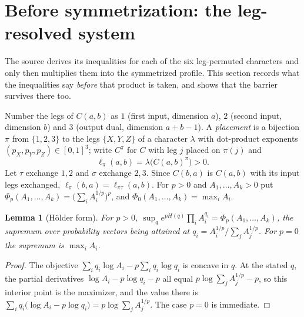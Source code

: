 \documentclass[11pt]{article}
\newtheorem{lemma}{Lemma}
\begin{document}
\section{Before symmetrization: the leg-resolved system}\label{sec:leg}
The source derives its inequalities for each of the six leg-permuted
characters and only then multiplies them into the symmetrized profile.
This section records what the inequalities say \emph{before} that
product is taken, and shows that the barrier survives there too.

Number the legs of $C(a,b)$ as $1$ (first input, dimension $a$),
$2$ (second input, dimension $b$) and $3$ (output dual, dimension
$a+b-1$). A \emph{placement} is a bijection $\pi$ from $\{1,2,3\}$ to
the legs $\{X,Y,Z\}$ of a character $\lambda$ with dot-product
exponents $(p_X,p_Y,p_Z)\in[0,1]^3$; write $C^\pi$ for $C$ with leg
$j$ placed on $\pi(j)$ and
\[
 \ell_\pi(a,b)=\lambda\bigl(C(a,b)^\pi\bigr)>0 .
\]
Let $\tau$ exchange $1,2$ and $\sigma$ exchange $2,3$. Since $C(b,a)$ is
$C(a,b)$ with its input legs exchanged, $\ell_\pi(b,a)=\ell_{\pi\tau}(a,b)$.
For $p>0$ and $A_1,\dots,A_k>0$ put
$\Phi_p(A_1,\dots,A_k)=\bigl(\sum_iA_i^{1/p}\bigr)^p$, and
$\Phi_0(A_1,\dots,A_k)=\max_iA_i$.

\begin{lemma}[H\"older form]\label{lem:hoelder}
For $p>0$,
$\sup_q e^{pH(q)}\prod_iA_i^{q_i}=\Phi_p(A_1,\dots,A_k)$, the supremum
over probability vectors being attained at $q_i=A_i^{1/p}/\sum_jA_j^{1/p}$.
For $p=0$ the supremum is $\max_iA_i$.
\end{lemma}
\begin{proof}
The objective $\sum_iq_i\log A_i-p\sum_iq_i\log q_i$ is concave in $q$.
At the stated $q$, the partial derivatives
$\log A_i-p\log q_i-p$ all equal $p\log\sum_jA_j^{1/p}-p$, so this
interior point is the maximizer, and the value there is
$\sum_iq_i\bigl(\log A_i-p\log q_i\bigr)=p\log\sum_jA_j^{1/p}$.
The case $p=0$ is immediate.
\end{proof}
\end{document}
